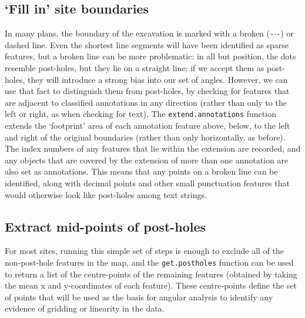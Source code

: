 \documentclass[10pt,fleqn]{article}
\begin{document}
\subsection{`Fill in' site boundaries}
In many plans, the boundary of the excavation is marked with a broken (\texttt{-$\cdot$-}) or dashed line. Even the shortest line segments will have been identified as sparse features, but a broken line can be more problematic: in all but position, the dots resemble post-holes, but they lie on a straight line; if we accept them as post-holes, they will introduce a strong bias into our set of angles. However, we can use that fact to distinguish them from post-holes, by checking for features that are adjacent to classified annotations in any direction (rather than only to the left or right, as when checking for text). The \texttt{extend.annotations} function extends the `footprint' area of each annotation feature above, below, to the left and right of the original boundaries (rather than only horizontally, as before). The index numbers of any features that lie within the extension are recorded, and any objects that are covered by the extension of more than one annotation are also set as annotations. This means that any points on a broken line can be identified, along with decimal points and other small punctuation features that would otherwise look like post-holes among text strings.

\subsection{Extract mid-points of post-holes}
For most sites, running this simple set of steps is enough to exclude all of the non-post-hole features in the map, and the \texttt{get.postholes} function can be used to return a list of the centre-points of the remaining features (obtained by taking the mean x and y-coordinates of each feature). These centre-points define the set of points that will be used as the basis for angular analysis to identify any evidence of gridding or linearity in the data. %
\end{document}
